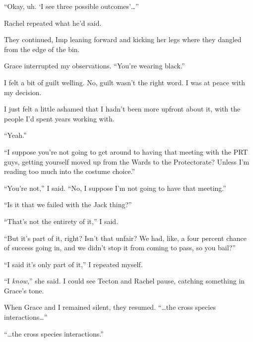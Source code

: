 ``Okay, uh.  `I see three possible outcomes'\ldots''



Rachel repeated what he'd said.



They continued, Imp leaning forward and kicking her legs where they dangled from the edge of the bin.



Grace interrupted my observations.  ``You're wearing black.''



I felt a bit of guilt welling.  No, guilt wasn't the right word.  I was at peace with my decision.



I just felt a little ashamed that I hadn't been more upfront about it, with the people I'd spent years working with.



``Yeah.''



``I suppose you're not going to get around to having that meeting with the PRT guys, getting yourself moved up from the Wards to the Protectorate?  Unless I'm reading too much into the costume choice.''



``You're not,'' I said.  ``No, I suppose I'm not going to have that meeting.''



``Is it that we failed with the Jack thing?''



``That's not the entirety of it,'' I said.



``But it's part of it, right?  Isn't that unfair?  We had, like, a four percent chance of success going in, and we didn't stop it from coming to pass, so you bail?''



``I said it's only part of it,'' I repeated myself.



``I \emph{know},'' she said.  I could see Tecton and Rachel pause, catching something in Grace's tone.



When Grace and I remained silent, they resumed.  ``\ldots{}the cross species interactions\ldots''



``\ldots{}the cross species interactions.''



